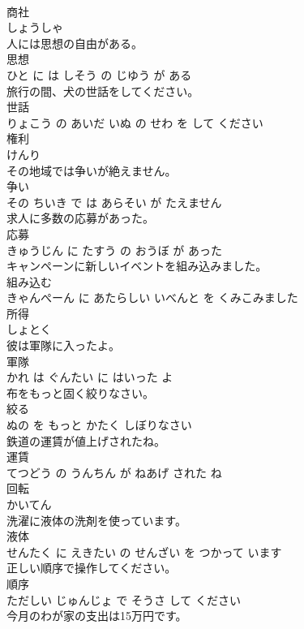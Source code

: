 \documentclass[8pt]{extreport}
\begin{document}
\begin{CJK}{UTF8}{min}
\\	商社	
\\	しょうしゃ		
\\	人には思想の自由がある。	
\\	思想 
\\	ひと に は しそう の じゆう が ある		
\\	旅行の間、犬の世話をしてください。	
\\	世話 
\\	りょこう の あいだ いぬ の せわ を して ください		
\\	権利	
\\	けんり		
\\	その地域では争いが絶えません。	
\\	争い 
\\	その ちいき で は あらそい が たえません		
\\	求人に多数の応募があった。	
\\	応募 
\\	きゅうじん に たすう の おうぼ が あった		
\\	キャンペーンに新しいイベントを組み込みました。	
\\	組み込む 
\\	きゃんぺーん に あたらしい いべんと を くみこみました		
\\	所得	
\\	しょとく		
\\	彼は軍隊に入ったよ。	
\\	軍隊 
\\	かれ は ぐんたい に はいった よ		
\\	布をもっと固く絞りなさい。	
\\	絞る 
\\	ぬの を もっと かたく しぼりなさい		
\\	鉄道の運賃が値上げされたね。	
\\	運賃 
\\	てつどう の うんちん が ねあげ された ね		
\\	回転	
\\	かいてん		
\\	洗濯に液体の洗剤を使っています。	
\\	液体 
\\	せんたく に えきたい の せんざい を つかって います		
\\	正しい順序で操作してください。	
\\	順序 
\\	ただしい じゅんじょ で そうさ して ください		
\\	今月のわが家の支出は15万円です。	

\end{CJK}
\end{document}
